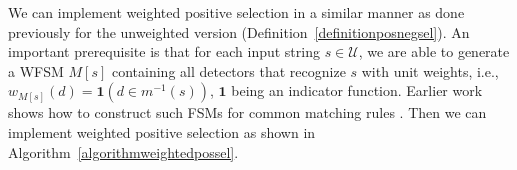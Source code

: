 \documentclass{llncs}
\newcommand{\text}[1]{\textrm{#1}}
\begin{document}

We can implement weighted positive %
selection in a similar manner as done previously for the unweighted version
(Definition~\ref{definitionposnegsel}). An important prerequisite is that 
for each input string $s \in \mathcal{U}$, we are able to generate a WFSM
$M[s]$ containing all detectors that recognize $s$ with unit weights, i.e.,
$w_{M[s]}(d) = \mathbf{1}(d \in m^{-1}(s))$, $\mathbf{1}$ being an indicator function.
Earlier work shows how to construct such FSMs for common matching 
rules \cite{Textor2014}. %
Then we can implement weighted positive selection as shown in Algorithm~\ref{algorithmweightedpossel}.



%



\end{document}
